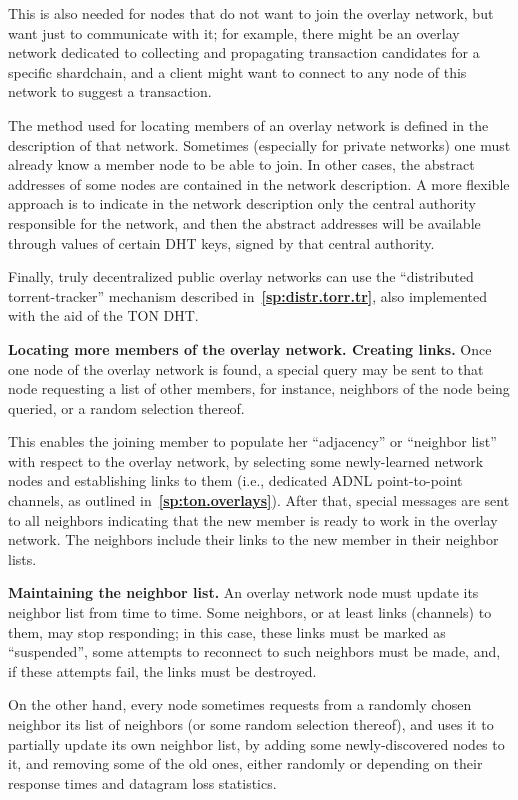 \documentclass[12pt,oneside]{article}
\def\makepoint#1{\medbreak\noindent{\bf #1.\ }}
\def\nxsubpoint{\refstepcounter{subsubsection}%
  \smallbreak\makepoint{\thesubsubsection}}
\def\refpoint#1{{\rm\textbf{\ref{#1}}}}
\let\ptref=\refpoint
\def\embt(#1.){\textbf{#1.}}
\begin{document}
This is also needed for nodes that do not want to join the overlay
network, but want just to communicate with it; for example, there
might be an overlay network dedicated to collecting and propagating
transaction candidates for a specific shardchain, and a client might
want to connect to any node of this network to suggest a transaction.

The method used for locating members of an overlay network is defined
in the description of that network. Sometimes (especially for private
networks) one must already know a member node to be able to join. In
other cases, the abstract addresses of some nodes are contained in the
network description. A more flexible approach is to indicate in the
network description only the central authority responsible for the
network, and then the abstract addresses will be available through
values of certain DHT keys, signed by that central authority.

Finally, truly decentralized public overlay networks can use the
``distributed torrent-tracker'' mechanism described
in~\ptref{sp:distr.torr.tr}, also implemented with the aid of the TON
DHT.

\nxsubpoint\label{sp:loc.many.mem} \embt(Locating more members of the
overlay network. Creating links.)  Once one node of the overlay
network is found, a special query may be sent to that node requesting
a list of other members, for instance, neighbors of the node being
queried, or a random selection thereof.

This enables the joining member to populate her ``adjacency'' or
``neighbor list'' with respect to the overlay network, by selecting
some newly-learned network nodes and establishing links to them (i.e.,
dedicated ADNL point-to-point channels, as outlined
in~\ptref{sp:ton.overlays}). After that, special messages are sent to
all neighbors indicating that the new member is ready to work in the
overlay network. The neighbors include their links to the new member
in their neighbor lists.

\nxsubpoint\label{sp:rand.mem} \embt(Maintaining the neighbor list.)
An overlay network node must update its neighbor list from time to
time. Some neighbors, or at least links (channels) to them, may stop
responding; in this case, these links must be marked as ``suspended'',
some attempts to reconnect to such neighbors must be made, and, if
these attempts fail, the links must be destroyed.

On the other hand, every node sometimes requests from a randomly
chosen neighbor its list of neighbors (or some random selection
thereof), and uses it to partially update its own neighbor list, by
adding some newly-discovered nodes to it, and removing some of the old
ones, either randomly or depending on their response times and
datagram loss statistics.
\end{document}
